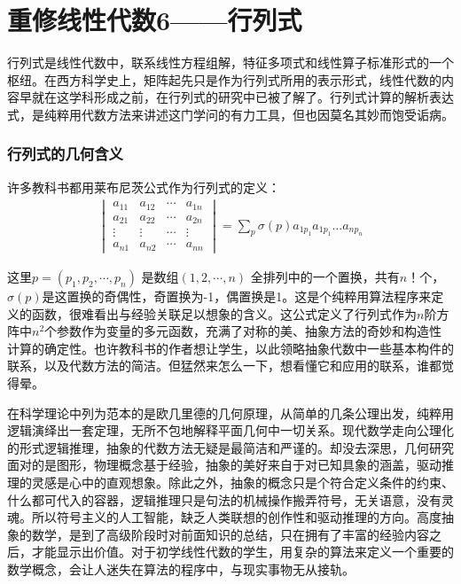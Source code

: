 \chapter{重修线性代数6——行列式}
	行列式是线性代数中，联系线性方程组解，特征多项式和线性算子标准形式的一个枢纽。在西方科学史上，矩阵起先只是作为行列式所用的表示形式，线性代数的内容早就在这学科形成之前，在行列式的研究中已被了解了。行列式计算的解析表达式，是纯粹用代数方法来讲述这门学问的有力工具，但也因莫名其妙而饱受诟病。
	
	\subsection{行列式的几何含义}
	
	许多教科书都用莱布尼茨公式作为行列式的定义：
	\begin{gather*}
		\begin{vmatrix}a_{11}& a_{12}&\cdots& a_{1n} \\a_{21}& a_{22}&\cdots& a_{2n} \\ \vdots & \vdots&\cdots&\vdots \\a_{n1}& a_{n2} &\cdots& a_{nn}  \end{vmatrix} = \sum_{p}\sigma (p) a_{1p_1}a_{1 p_1}\dots a_{n p_n}
	\end{gather*}

	这里$ p=(p_1,p_2,\cdots, p_n) $ 是数组$  (1, 2,\cdots, n) $ 全排列中的一个置换，共有$ n！ $个，$ \sigma(p) $是这置换的奇偶性，奇置换为-1，偶置换是1。这是个纯粹用算法程序来定义的函数，很难看出与经验关联足以想象的含义。这公式定义了行列式作为$ n $阶方阵中$ n^2 $个参数作为变量的多元函数，充满了对称的美、抽象方法的奇妙和构造性计算的确定性。也许教科书的作者想让学生，以此领略抽象代数中一些基本构件的联系，以及代数方法的简洁。但猛然来怎么一下，想看懂它和应用的联系，谁都觉得晕。
	
	在科学理论中列为范本的是欧几里德的几何原理，从简单的几条公理出发，纯粹用逻辑演绎出一套定理，无所不包地解释平面几何中一切关系。现代数学走向公理化的形式逻辑推理，抽象的代数方法无疑是最简洁和严谨的。却没去深思，几何研究面对的是图形，物理概念基于经验，抽象的美好来自于对已知具象的涵盖，驱动推理的灵感是心中的直观想象。除此之外，抽象的概念只是个符合定义条件的约束、什么都可代入的容器，逻辑推理只是句法的机械操作搬弄符号，无关语意，没有灵魂。所以符号主义的人工智能，缺乏人类联想的创作性和驱动推理的方向。高度抽象的数学，是到了高级阶段时对前面知识的总结，只在拥有了丰富的经验内容之后，才能显示出价值。对于初学线性代数的学生，用复杂的算法来定义一个重要的数学概念，会让人迷失在算法的程序中，与现实事物无从接轨。
	
